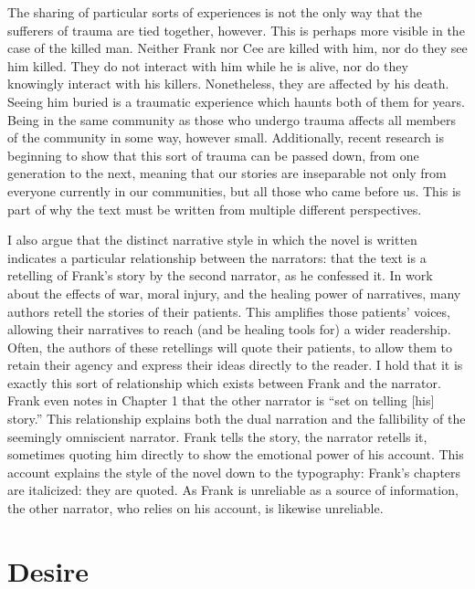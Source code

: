 \documentclass[12pt]{article}
\begin{document}
The sharing of particular sorts of experiences is not the only way that the
sufferers of trauma are tied together, however. This is perhaps more visible in
the case of the killed man. Neither Frank nor Cee are killed with him, nor do
they see him killed. They do not interact with him while he is alive, nor do
they knowingly interact with his killers. Nonetheless, they are affected by his
death. Seeing him buried is a traumatic experience which haunts both of them
for years. Being in the same community as those who undergo trauma affects all
members of the community in some way, however small. Additionally, recent
research is beginning to show that this sort of trauma can be passed down, from
one generation to the next,\autocite{Dias13a,Love10} meaning that our stories
are inseparable not only from everyone currently in our communities, but all
those who came before us. This is part of why the text must be written from
multiple different perspectives.

I also argue that the distinct narrative style in which the novel is written
indicates a particular relationship between the narrators: that the text is a
retelling of Frank's story by the second narrator, as he confessed it. In work
about the effects of war, moral injury, and the healing power of narratives,
many authors retell the stories of their
patients.\autocite{Shay95,Lipsky09,Brock15,Charon06} This amplifies those
patients' voices, allowing their narratives to reach (and be healing tools for)
a wider readership. Often, the authors of these retellings will quote their
patients, to allow them to retain their agency and express their ideas directly
to the reader. I hold that it is exactly this sort of relationship which exists
between Frank and the narrator. Frank even notes in Chapter 1 that the other
narrator is ``set on telling [his] story.''\autocite[p.~6]{Morrison12} This
relationship explains both the dual narration and the fallibility of the
seemingly omniscient narrator. Frank tells the story, the narrator retells it,
sometimes quoting him directly to show the emotional power of his account. This
account explains the style of the novel down to the typography: Frank's
chapters are italicized: they are quoted. As Frank is unreliable as a source of
information, the other narrator, who relies on his account, is likewise
unreliable.

\section{Desire}
\end{document}
